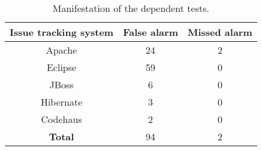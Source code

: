 \begin{table}
\begin{center}
\setlength{\tabcolsep}{0.5\tabcolsep}
\begin{tabular}{|c||c|c|}
\hline
\textbf{Issue tracking system} & \textbf{False alarm} & \textbf{Missed alarm} \\
\hline
Apache &24 & 2 \\
\hline
Eclipse & 59 & 0 \\
\hline
JBoss& 6 & 0 \\
\hline
Hibernate & 3 & 0 \\
\hline
Codehaus & 2 & 0 \\
\hline
\hline
\textbf{Total}  & 94 & 2 \\
\hline
\end{tabular}
\end{center}
\caption{
Manifestation of the \dtnum dependent tests.
}
\label{tab:reper}
\end{table}

